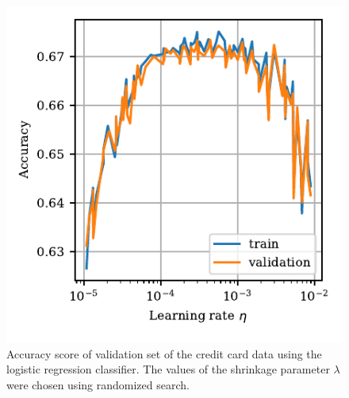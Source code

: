 \documentclass[a4paper, 11pt, twocolumn]{article}
\begin{document}
\begin{figure}[H]
	\includegraphics[scale=1]{figures/logreg_learning_rate_accuracy.pdf}
	\caption{Accuracy score of validation set of the credit card data using the logistic regression classifier. The values of the shrinkage parameter $\lambda$ were chosen using randomized search.}
\end{figure}


\begin{table}[H]
\centering
{}  
\end{table}
\end{document}
